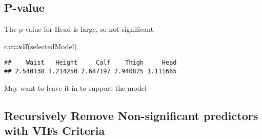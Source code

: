 \documentclass[]{article}
\newenvironment{Shaded}{\begin{snugshade}}{\end{snugshade}}
\newcommand{\KeywordTok}[1]{\textcolor[rgb]{0.13,0.29,0.53}{\textbf{#1}}}
\newcommand{\OperatorTok}[1]{\textcolor[rgb]{0.81,0.36,0.00}{\textbf{#1}}}
\newcommand{\NormalTok}[1]{#1}
\begin{document}
\subsection{P-value}\label{p-value}

The p-value for Head is large, so not significant

\begin{Shaded}
\begin{Highlighting}[]
\NormalTok{car}\OperatorTok{::}\KeywordTok{vif}\NormalTok{(selectedModel)}
\end{Highlighting}
\end{Shaded}

\begin{verbatim}
##    Waist   Height     Calf    Thigh     Head 
## 2.540138 1.214250 2.687197 2.940825 1.111665
\end{verbatim}

May want to leave it in to support the model

\subsection{Recursively Remove Non-significant predictors with VIFs
Criteria}\label{recursively-remove-non-significant-predictors-with-vifs-criteria}
\end{document}
